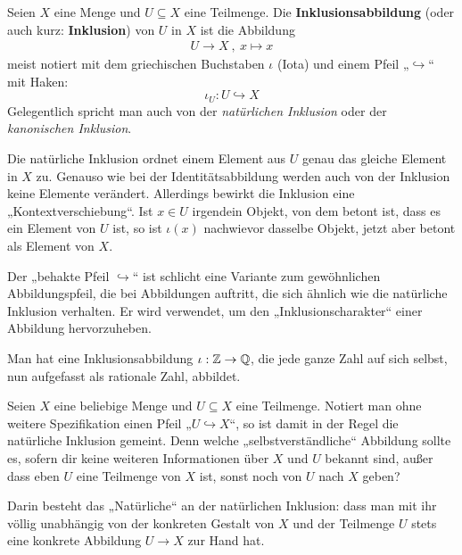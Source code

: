 \begin{de}[Inklusionsabbildung] \label{def:inklusion} 
    Seien $X$ eine Menge und $U\subseteq X$ eine Teilmenge. Die \textbf{Inklusionsabbildung} (oder auch kurz: \textbf{Inklusion}) von $U$ in $X$ ist die Abbildung
    \begin{align*}
        U \to X \ ,\ x \mapsto x
    \end{align*}
    meist notiert mit dem griechischen Buchstaben $\iota$ (Iota) und einem Pfeil „$\hookrightarrow$“ mit Haken:
        \[ \iota_U : U \hookrightarrow X \]
    Gelegentlich spricht man auch von der \emph{natürlichen Inklusion} oder der \emph{kanonischen Inklusion}.
\end{de}


\begin{bem}
    Die natürliche Inklusion ordnet einem Element aus $U$ genau das gleiche Element in $X$ zu. Genauso wie bei der Identitätsabbildung werden auch von der Inklusion keine Elemente verändert. Allerdings bewirkt die Inklusion eine „Kontextverschiebung“. Ist $x\in U$ irgendein Objekt, von dem betont ist, dass es ein Element von $U$ ist, so ist $\iota(x)$ nachwievor dasselbe Objekt, jetzt aber betont als Element von $X$.
    
    Der „behakte Pfeil $\hookrightarrow$“ ist schlicht eine Variante zum gewöhnlichen Abbildungspfeil, die bei Abbildungen auftritt, die sich ähnlich wie die natürliche Inklusion verhalten. Er wird verwendet, um den „Inklusionscharakter“ einer Abbildung hervorzuheben. 
\end{bem}


\begin{bsp}
    Man hat eine Inklusionsabbildung $\iota : \mathbb Z \to \mathbb Q$, die jede ganze Zahl auf sich selbst, nun aufgefasst als rationale Zahl, abbildet.
\end{bsp}


\begin{bem}
    Seien $X$ eine beliebige Menge und $U\subseteq X$ eine Teilmenge. Notiert man ohne weitere Spezifikation einen Pfeil „$U\hookrightarrow X$“, so ist damit in der Regel die natürliche Inklusion gemeint. Denn welche „selbstverständliche“ Abbildung sollte es, sofern dir keine weiteren Informationen über $X$ und $U$ bekannt sind, außer dass eben $U$ eine Teilmenge von $X$ ist, sonst noch von $U$ nach $X$ geben?
    
    Darin besteht das „Natürliche“ an der natürlichen Inklusion: dass man mit ihr völlig unabhängig von der konkreten Gestalt von $X$ und der Teilmenge $U$ stets eine konkrete Abbildung $U\to X$ zur Hand hat.
\end{bem}


